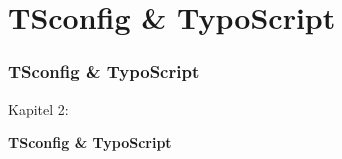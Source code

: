 %

\section{TSconfig \& TypoScript}
\begin{frame}[fragile]
	\frametitle{TSconfig \& TypoScript}

	\begin{center}\huge{Kapitel 2:}\end{center}
	\begin{center}\huge{\color{typo3darkgrey}\textbf{TSconfig \& TypoScript}}\end{center}

\end{frame}

